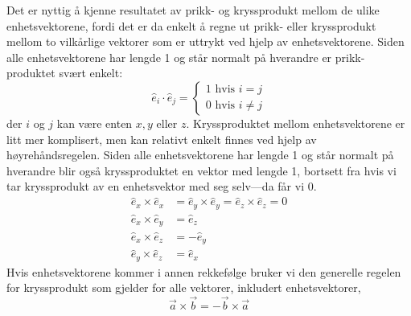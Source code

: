 \documentclass[a4paper,norsk,12pt]{book}
\def\ex{\ensuremath{\hat{e}_x}}
\def\ey{\ensuremath{\hat{e}_y}}
\def\ez{\ensuremath{\hat{e}_z}}
\begin{document}
Det er nyttig å kjenne resultatet av prikk- og kryssprodukt mellom de ulike enhetsvektorene, fordi det er da enkelt å regne ut prikk- eller kryssprodukt mellom to vilkårlige vektorer som er uttrykt ved hjelp av enhetsvektorene. Siden alle enhetsvektorene har lengde 1 og står normalt på hverandre er prikk-produktet svært enkelt:
\begin{displaymath}
	\hat{e}_i \cdot \hat{e}_j = 
	\left\{
		\begin{aligned}
		1 \text{ hvis } i = j \\
		0 \text{ hvis } i\neq j
		\end{aligned}
	\right.
	\label{eq:vektor:prikkprodukt}
\end{displaymath}
der $i$ og $j$ kan være enten $x, y$ eller $z$. Kryssproduktet mellom enhetsvektorene er litt mer komplisert, men kan relativt enkelt finnes ved hjelp av høyrehåndsregelen. Siden alle enhetsvektorene har lengde 1 og står normalt på hverandre blir også kryssproduktet en vektor med lengde 1, bortsett fra hvis vi tar kryssprodukt av en enhetsvektor med seg selv---da får vi 0.
\begin{displaymath}
\begin{aligned}
	\ex\times\ex &= \ey\times\ey = \ez\times\ez = 0 \\
	\ex \times \ey & = \ez \\
	\ex \times \ez & = -\ey \\
	\ey \times \ez &= \ex 
	\label{eq:vektor:kryssprodukt}
\end{aligned}
\end{displaymath}
Hvis enhetsvektorene kommer i annen rekkefølge bruker vi den generelle regelen for kryssprodukt som gjelder for alle vektorer, inkludert enhetsvektorer, 
\begin{displaymath}
	\vec{a}\times\vec{b} = -\vec{b}\times\vec{a}
\end{displaymath}
\end{document}
